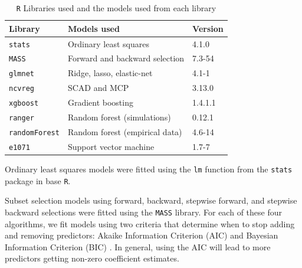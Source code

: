 \documentclass{article}
\begin{document}
	\begin{table}[h]
		\centering
		\caption{\lstinline!R! Libraries used and the models used from each library}
		\label{tab:model-libraries}
		\begin{tabular}{lll}\hline
			\textbf{Library}    	  & \textbf{Models used}                                 & \textbf{Version} \\ \hline
			\lstinline!stats! \cite{r}   	  & Ordinary least squares                               & 4.1.0            \\
			\lstinline!MASS! \cite{venables2002mass}   	  & Forward and backward selection                       & 7.3-54           \\
			\lstinline!glmnet! \cite{friedman2010regularization} 	  & Ridge, lasso, elastic-net                            & 4.1-1            \\
			\lstinline!ncvreg! \cite{breheny2011ncvreg}	      & SCAD and MCP                                         & 3.13.0           \\
			\lstinline!xgboost! \cite{chen2021xgboost}	  & Gradient boosting                                    & 1.4.1.1          \\
			\lstinline!ranger! \cite{wright2017ranger} 	  & Random forest (simulations)                          & 0.12.1           \\
			\lstinline!randomForest! \cite{liaw2002rf} & Random forest (empirical data)                       & 4.6-14           \\
			\lstinline!e1071! \cite{meyer2021e1071}  	  & Support vector machine                               & 1.7-7            \\\hline
		\end{tabular}
	\end{table}
	
	Ordinary least squares models were fitted using the \lstinline!lm! function from the \lstinline!stats! package in base \lstinline!R!.
	
	Subset selection models using forward, backward, stepwise forward, and stepwise backward selections were fitted using the \lstinline!MASS! library. For each of these four algorithms, we fit models using two criteria that determine when to stop adding and removing predictors: Akaike Information Criterion (AIC) and Bayesian Information Criterion (BIC) \cite{akaike1998information, schwarz1978estimating}. In general, using the AIC will lead to more predictors getting non-zero coefficient estimates.
	
\end{document}
